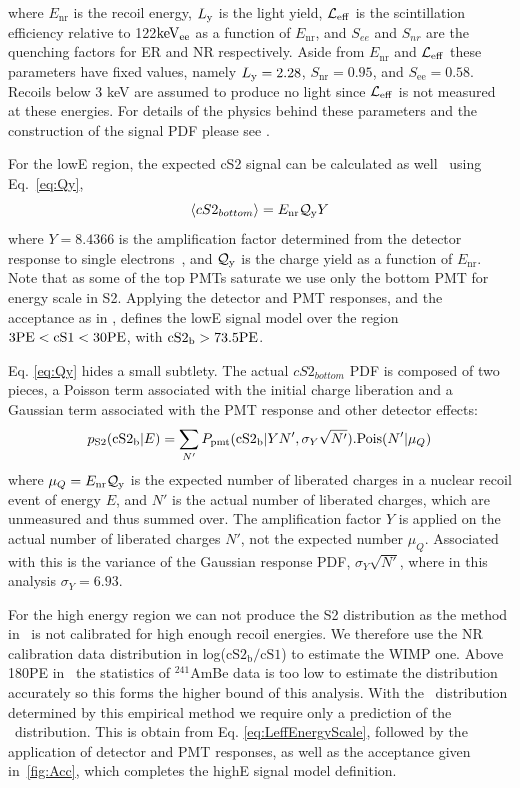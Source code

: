 where $E_\mathrm{nr}$ is the recoil energy, $L_{\mathrm{y}}$ is the light yield, $\mathcal{L}_{\mathrm{eff}}$ is the scintillation efficiency relative to 122$\mathrm{keV_{ee}}$ as a function of $E_\mathrm{nr}$, and $S_{ee}$ and $S_{nr}$ are the quenching factors for ER and NR respectively. Aside from $E_\mathrm{nr}$ and $\mathcal{L}_{\mathrm{eff}}$ these parameters have fixed values, namely $L_{\mathrm{y}} = 2.28$, $S_\mathrm{nr} = 0.95$, and $S_\mathrm{ee} = 0.58$. Recoils below 3 keV are assumed to produce no light since $\mathcal{L}_{\mathrm{eff}}$ is not measured at these energies. For details of the physics behind these parameters and the construction of the signal PDF please see \cite{xe100_ana2012,xe100_run_combination}. 

For the lowE region, the expected cS2 signal can be calculated as well~\cite{DataMCXenon} using Eq.~\ref{eq:Qy},
%
\begin{equation}
\label{eq:Qy}
	\langle cS2_{bottom} \rangle = E_{\mathrm{nr}}\mathcal{Q}_{\mathrm{y}} Y   
\end{equation}
%
where $Y = 8.4366$ is the amplification factor determined from the detector response to single electrons~\cite{XenonSingleElectron}, and $\mathcal{Q}_{\mathrm{y}}$ is the charge yield as a function of $E_\mathrm{nr}$. Note that as some of the top PMTs saturate we use only the bottom PMT for energy scale in S2. Applying the detector and PMT responses, and the acceptance as in \cite{xe100_run_combination}, defines the lowE signal model over the region $3 \mathrm{PE} < \mathrm{cS1} < 30 \mathrm{PE}$, with $\mathrm{cS2}_\mathrm{b} > 73.5 \mathrm{PE}$.

Eq. \ref{eq:Qy} hides a small subtlety. The actual $cS2_{bottom}$ PDF is composed of two pieces, a Poisson term associated with the initial charge liberation and a Gaussian term associated with the PMT response and other detector effects:
%
\begin{equation}
\label{eq.cS2pdf}
p_\mathrm{S2}(\mathrm{\mathrm{cS2}_\mathrm{b}}|E) = \sum_{N'} P_\mathrm{pmt}(\mathrm{\mathrm{cS2}_\mathrm{b}}|Y N',\sigma_Y \sqrt{N'}).\mathrm{Pois}(N'|\mu_Q)
\end{equation}
%
where $\mu_Q=E_{\mathrm{nr}}\mathcal{Q}_{\mathrm{y}}$ is the expected number of liberated charges in a nuclear recoil event of energy $E$, and $N'$ is the actual number of liberated charges, which are unmeasured and thus summed over. The amplification factor $Y$ is applied on the actual number of liberated charges $N'$, not the expected number $\mu_Q$. Associated with this is the variance of the Gaussian response PDF, $\sigma_Y\sqrt{N'}$, where in this analysis $\sigma_Y = 6.93$. 

For the high energy region we can not produce the S2 distribution as the method in~\cite{DataMCXenon} is not calibrated for high enough recoil energies. We therefore use the NR calibration data distribution in log($\mathrm{cS2_b/cS1}$) to estimate the WIMP one. Above 180PE in \cSi\ the statistics of $^{241}$AmBe data is too low to estimate the distribution accurately so this forms the higher bound of this analysis. With the \cSiib\ distribution determined by this empirical method we require only a prediction of the \cSi\ distribution. This is obtain from Eq. \ref{eq:LeffEnergyScale}, followed by the application of detector and PMT responses, as well as the acceptance given in~\ref{fig:Acc}, which completes the highE signal model definition.

